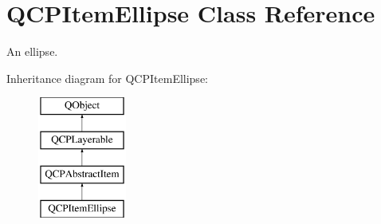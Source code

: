 \hypertarget{classQCPItemEllipse}{\section{Q\-C\-P\-Item\-Ellipse Class Reference}
\label{classQCPItemEllipse}
}


An ellipse.  


Inheritance diagram for Q\-C\-P\-Item\-Ellipse\-:\begin{figure}[H]
\begin{center}
\leavevmode
\includegraphics[height=4.000000cm]{classQCPItemEllipse}
\end{center}
\end{figure}
